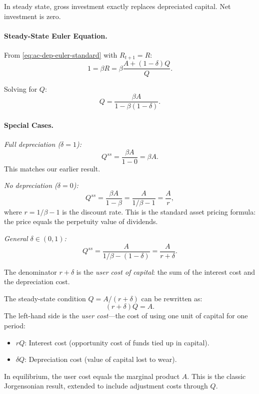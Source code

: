 In steady state, gross investment exactly replaces depreciated capital. Net investment is zero.

\paragraph{Steady-State Euler Equation.}
From \cref{eq:ac-dep-euler-standard} with $R_{t+1} = R$:
\begin{equation}
1 = \beta R = \beta \frac{A + (1-\delta) Q}{Q}.
\label{eq:ac-dep-ss-euler}
\end{equation}

Solving for $Q$:
\begin{equation}
Q = \frac{\beta A}{1 - \beta(1-\delta)}.
\label{eq:ac-dep-Q-ss}
\end{equation}

\paragraph{Special Cases.}

\medskip
\noindent
\textit{Full depreciation ($\delta = 1$):}
\begin{equation}
Q^{ss} = \frac{\beta A}{1 - 0} = \beta A.
\label{eq:ac-dep-Q-ss-full}
\end{equation}
This matches our earlier result.

\medskip
\noindent
\textit{No depreciation ($\delta = 0$):}
\begin{equation}
Q^{ss} = \frac{\beta A}{1 - \beta} = \frac{A}{1/\beta - 1} = \frac{A}{r},
\label{eq:ac-dep-Q-ss-none}
\end{equation}
where $r = 1/\beta - 1$ is the discount rate. This is the standard asset pricing formula: the price equals the perpetuity value of dividends.

\medskip
\noindent
\textit{General $\delta \in (0,1)$:}
\begin{equation}
Q^{ss} = \frac{A}{1/\beta - (1-\delta)} = \frac{A}{r + \delta}.
\label{eq:ac-dep-Q-ss-general}
\end{equation}

The denominator $r + \delta$ is the \emph{user cost of capital}: the sum of the interest cost and the depreciation cost.

\begin{calloutnote}
The steady-state condition $Q = A / (r + \delta)$ can be rewritten as:
\[
(r + \delta) Q = A.
\]
The left-hand side is the \emph{user cost}---the cost of using one unit of capital for one period:
\begin{itemize}[nosep]
\item $r Q$: Interest cost (opportunity cost of funds tied up in capital).
\item $\delta Q$: Depreciation cost (value of capital lost to wear).
\end{itemize}
In equilibrium, the user cost equals the marginal product $A$. This is the classic Jorgensonian result, extended to include adjustment costs through $Q$.
\end{calloutnote}

